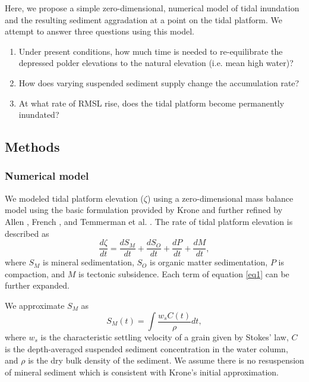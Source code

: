 \documentclass[12pt]{article}
\begin{document}
Here, we propose a simple zero-dimensional, numerical model of tidal inundation and the resulting sediment aggradation at a point on the tidal platform. We attempt to answer three questions using this model.

\begin{enumerate}
	\item Under present conditions, how much time is needed to re-equilibrate the depressed polder elevations to the natural elevation (i.e. mean high water)?
	\item How does varying suspended sediment supply change the accumulation rate?
	\item At what rate of RMSL rise, does the tidal platform become permanently inundated?
\end{enumerate}

\subsection{Methods}

\subsubsection*{Numerical model}

We modeled tidal platform elevation ($\zeta$) using a zero-dimensional mass balance model using the basic formulation provided by Krone \cite{kroneMethodSimulatingMarsh1987} and further refined by Allen \cite{allenSaltmarshGrowthStratification1990}, French \cite{frenchNumericalSimulationVertical1993}, and Temmerman et al. \cite{temmermanModellingLongtermTidal2003,temmermanModellingEstuarineVariations2004}. The rate of tidal platform elevation is described as
\begin{equation}\label{eq1}
	\frac{d \zeta}{d t} = \frac{d S_M}{d t} + \frac{d S_O}{d t} + \frac{d P}{d t} + \frac{d M}{d t},
\end{equation}
where $S_M$ is mineral sedimentation, $S_O$ is organic matter sedimentation, $P$ is compaction, and $M$ is tectonic subsidence. Each term of equation \ref{eq1} can be further expanded.

We approximate $S_M$ as
\begin{equation}\label{eq2}
	S_M(t) = \int{\frac{w_{s}C(t)}{\rho}dt},
\end{equation}
where $w_s$ is the characteristic settling velocity of a grain given by Stokes' law, $C$ is the depth-averaged suspended sediment concentration in the water column, and $\rho$ is the dry bulk density of the sediment. We assume there is no resuspension of mineral sediment which is consistent with Krone's \cite{kroneMethodSimulatingMarsh1987} initial approximation.
\end{document}
